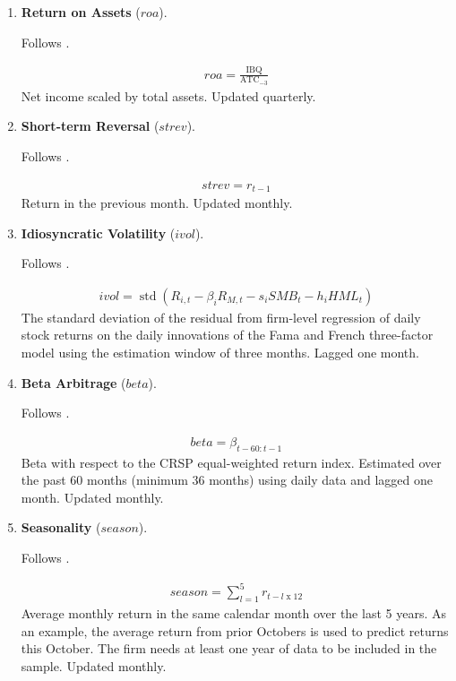 \begin{enumerate}
	
	
	\item \textbf{Return on Assets} ($roa$). 
	
	Follows . 
	
	\begin{align*}
		roa = \frac{ \mathrm{IBQ} }{ \mathrm{ATC}_{-3} }
	\end{align*}
	Net income scaled by total assets. Updated quarterly.
	
	
	
	\item \textbf{Short-term Reversal} ($strev$). 
	
	Follows . 
	
	\begin{align*}
		strev = r_{t-1}
	\end{align*}	
	Return in the previous month. Updated monthly.
	
	
	
	\item \textbf{Idiosyncratic Volatility} ($ivol$). 
	
	Follows . 
	
	\begin{align*}
		ivol = \operatorname{std} \left( R_{i,t} - \beta_i R_{M,t} - s_i SMB_t - h_i HML_t \right)
	\end{align*}
	The standard deviation of the residual from firm-level regression of daily stock returns on the daily innovations of the Fama and French three-factor model using the estimation window of three months. Lagged one month.
	


	\item \textbf{Beta Arbitrage} ($beta$). 
	
	Follows . 
	
	\begin{align*}
		beta = \beta_{t-60:t-1}
	\end{align*}
	Beta with respect to the CRSP equal-weighted return index. Estimated over the past 60 months (minimum 36 months) using daily data and lagged one month. Updated monthly.
	
	
		
	\item \textbf{Seasonality} ($season$). 
	
	Follows . 
	
	\begin{align*}
		season = \sum_{l=1}^5 r_{t-l\operatorname{x}12}
	\end{align*}
	Average monthly return in the same calendar month over the last 5 years. As an example, the average return from prior Octobers is used to predict returns this October. The firm needs at least one year of data to be included in the sample. Updated monthly.
	

\end{enumerate}
